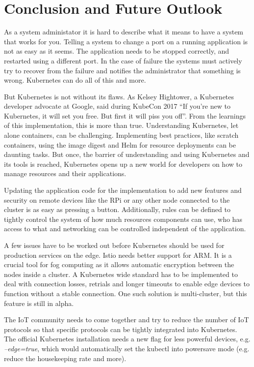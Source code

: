 \clearpage
\section{Conclusion and Future Outlook}
As a system administator it is hard to describe what it means to have a system that works for you. Telling a system to change a port on a running application is not as easy as it seems. The application needs to be stopped correctly, and restarted using a different port. In the case of failure the systems must actively try to recover from the failure and notifies the administrator that something is wrong. Kubernetes can do all of this and more.

But Kubernetes is not without its flaws. As Kelsey Hightower, a Kubernetes developer advocate at Google, said during KubeCon 2017 ``If you’re new to Kubernetes, it will set you free. But first it will piss you off''\cite{KubernetesPissYouOff:online}. From the learnings of this implementation, this is more than true. Understanding Kubernetes, let alone containers, can be challenging. Implementing best practices, like scratch containers, using the image digest and Helm for resource deployments can be daunting tasks. But once, the barrier of understanding and using Kubernetes and its tools is reached, Kubernetes opens up a new world for developers on how to manage resources and their applications.

Updating the application code for the implementation to add new features and security on remote devices like the RPi or any other node connected to the cluster is as easy as pressing a button. Additionally, rules can be defined to tightly control the system of how much resources components can use, who has access to what and networking can be controlled independent of the application. \\[5mm]

{}

A few issues have to be worked out before Kubernetes should be used for production services on the edge. Istio needs better support for ARM. It is a crucial tool for fog computing as it allows automatic encryption between the nodes inside a cluster. A Kubernetes wide standard has to be implemented to deal with connection losses, retrials and longer timeouts to enable edge devices to function without a stable connection. One such solution is multi-cluster, but this feature is still in alpha. 

The IoT community needs to come together and try to reduce the number of IoT protocols so that specific protocols can be tightly integrated into Kubernetes. The official Kubernetes installation needs a new flag for less powerful devices, e.g. \textit{--edge=true}, which would automatically set the kubectl into powersave mode (e.g. reduce the housekeeping rate and more). 

